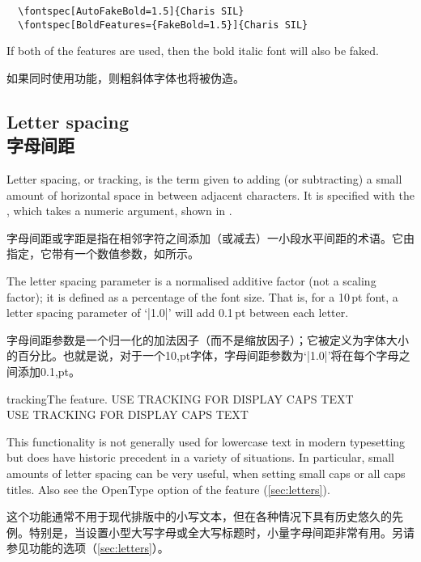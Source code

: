 \documentclass[a4paper]{l3doc}
\begin{document}
\begin{Verbatim}
  \fontspec[AutoFakeBold=1.5]{Charis SIL}
  \fontspec[BoldFeatures={FakeBold=1.5}]{Charis SIL}
\end{Verbatim}
If both of the  features are used, then the bold italic
font will also be faked.

如果同时使用功能，则粗斜体字体也将被伪造。

\subsection{Letter spacing\\字母间距}
Letter spacing, or tracking, is the term given to adding (or subtracting) a small amount of horizontal space in between adjacent characters. It is specified with the , which takes a numeric argument,
shown in .

字母间距或字距是指在相邻字符之间添加（或减去）一小段水平间距的术语。它由指定，它带有一个数值参数，如所示。

The letter spacing parameter is a normalised additive factor (not a scaling factor); it is defined as a percentage of the font size. That is, for a 10\,pt font, a letter spacing parameter of `|1.0|' will add 0.1\,pt between each letter.

字母间距参数是一个归一化的加法因子（而不是缩放因子）；它被定义为字体大小的百分比。也就是说，对于一个10,pt字体，字母间距参数为`|1.0|'将在每个字母之间添加0.1,pt。

\begin{Xexample}{tracking}{The  feature.}
  USE TRACKING FOR DISPLAY CAPS TEXT \\
  USE TRACKING FOR DISPLAY CAPS TEXT
\end{Xexample}

This functionality is not generally used for lowercase text in modern typesetting but does have historic precedent in a variety of situations.
In particular, small amounts of letter spacing can be very useful, when setting small caps or all caps titles.
Also see the OpenType  option of the  feature (\vref{sec:letters}).

这个功能通常不用于现代排版中的小写文本，但在各种情况下具有历史悠久的先例。特别是，当设置小型大写字母或全大写标题时，小量字母间距非常有用。另请参见功能的选项（\vref{sec:letters}）。
\end{document}
